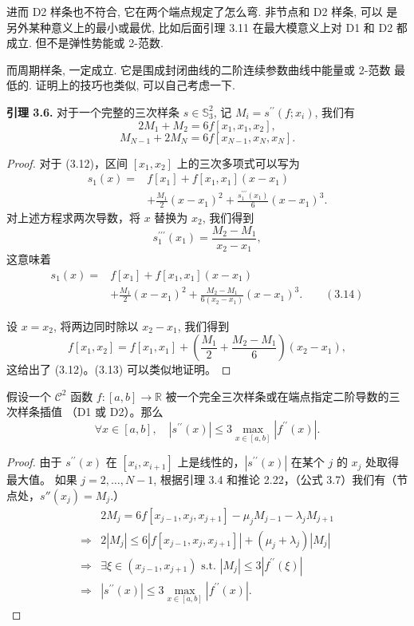 \documentclass[a4paper]{ctexart}
\begin{document}
{进而 D2 样条也不符合, 它在两个端点规定了怎么弯. 非节点和 D2 样条, 可以
是另外某种意义上的最小或最优, 比如后面引理 3.11 在最大模意义上对 D1 和
D2 都成立. 但不是弹性势能或 2-范数.

而周期样条, 一定成立. 它是围成封闭曲线的二阶连续参数曲线中能量或 2-范数
最低的. 证明上的技巧也类似, 可以自己考虑一下.

\noindent \textbf{引理 3.6.} 对于一个完整的三次样条 $s\in \mathbb{S}_{3}^{2}$, 记 $M_{i}=s^{\prime\prime}\left(f; x_{i}\right)$, 
我们有
\[
2 M_{1} + M_{2} = 6 f\left[x_{1}, x_{1}, x_{2}\right], \tag{3.12}
\]
\[
M_{N - 1} + 2 M_N = 6 f\left[x_{N - 1}, x_N, x_N\right].\tag{3.13}
\]

\begin{proof}
对于 (3.12)，区间 $\left[x_{1}, x_{2}\right]$ 上的三次多项式可以写为
\begin{align*}
s_1(x) = & f\left[x_1\right] + f\left[x_1, x_1\right]\left(x - x_1\right)\\
& + \frac{M_1}{2}\left(x - x_1\right)^2 + \frac{s_1^{\prime\prime\prime}\left(x_1\right)}{6}\left(x - x_1\right)^3.
\end{align*}
对上述方程求两次导数，将 $x$ 替换为 $x_{2}$, 我们得到 
$$
s_{1}^{\prime\prime\prime}\left(x_{1}\right) = \frac{M_{2} - M_{1}}{x_{2} - x_{1}},
$$
这意味着
\begin{align*}
s_1(x)=& f\left[x_1\right]+f\left[x_1, x_1\right]\left(x-x_1\right)\\
&+\frac{M_1}{2}\left(x-x_1\right)^2+\frac{M_2-M_1}{6\left(x_2-x_1\right)}\left(x-x_1\right)^3. \qquad(3.14)
\end{align*}

设 $x = x_{2}$, 将两边同时除以 $x_{2} - x_{1}$, 我们得到
\[
f\left[x_{1}, x_{2}\right]=f\left[x_{1}, x_{1}\right]+\left(\frac{M_{1}}{2}+\frac{M_{2}-M_{1}}{6}\right)\left(x_{2}-x_{1}\right),
\]
这给出了 (3.12)。(3.13) 可以类似地证明。
\end{proof}

 假设一个 \(\mathcal{C}^{2}\) 函数 \(f:[a, b]\rightarrow \mathbb{R}\) 
被一个完全三次样条或在端点指定二阶导数的三次样条插值 （D1 或 D2）。那么
\[ 
\forall x \in [a, b], \quad \left|s^{\prime\prime}(x)\right| \leq 3 \max_{x \in [a, b]} \left|f^{\prime\prime}(x)\right|. \tag{3.18} 
\]

\begin{proof} 由于 \(s^{\prime\prime}(x)\) 在 \([x_i, x_{i+1}]\) 上是线性的，\(\left|s^{\prime\prime}(x)\right|\) 在某个 \(j\) 的 \(x_j\) 处取得最大值。
  如果 \(j = 2, \ldots, N-1\), 根据引理 3.4 和推论 2.22，（公式 3.7）我们有（节点处，$s''(x_j) = M_j$.）
\begin{align*}
& 2 M_j = 6 f[x_{j-1}, x_j, x_{j+1}] - \mu_j M_{j-1} - \lambda_j M_{j+1} \\
\Rightarrow & 2 \left|M_j\right| \leq 6 \left|f[x_{j-1}, x_j, x_{j+1}]\right| + (\mu_j + \lambda_j) \left|M_j\right| \\
\Rightarrow & \exists \xi \in (x_{j-1}, x_{j+1}) \text{ s.t. } \left|M_j\right| \leq 3 \left|f^{\prime\prime}(\xi)\right| \\
\Rightarrow & \left|s^{\prime\prime}(x)\right| \leq 3 \max_{x \in [a, b]} \left|f^{\prime\prime}(x)\right|.
\end{align*} 


\end{proof}}
\end{document}
